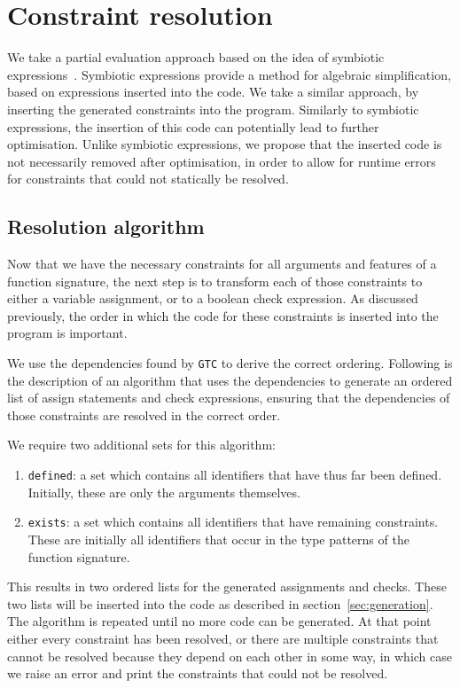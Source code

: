 \documentclass[sigconf,screen]{acmart}
\begin{document}
\section{Constraint resolution}
We take a partial evaluation approach based on the idea of symbiotic expressions~\cite{sac-symbiotic}.
Symbiotic expressions provide a method for algebraic simplification, based on expressions inserted into the code.
We take a similar approach, by inserting the generated constraints into the program.
Similarly to symbiotic expressions, the insertion of this code can potentially lead to further optimisation.
Unlike symbiotic expressions, we propose that the inserted code is not necessarily removed after optimisation, in order to allow for runtime errors for constraints that could not statically be resolved.

\subsection{Resolution algorithm}\label{sec:resoltion}
Now that we have the necessary constraints for all arguments and features of a function signature, the next step is to transform each of those constraints to either a variable assignment, or to a boolean check expression.
As discussed previously, the order in which the code for these constraints is inserted into the program is important.

We use the dependencies found by \texttt{GTC} to derive the correct ordering.
Following is the description of an algorithm that uses the dependencies to generate an ordered list of assign statements and check expressions, ensuring that the dependencies of those constraints are resolved in the correct order.

We require two additional sets for this algorithm:
\begin{enumerate}
  \item \texttt{defined}: a set which contains all identifiers that have thus far been defined.
  Initially, these are only the arguments themselves.
  \item \texttt{exists}: a set which contains all identifiers that have remaining constraints.
  These are initially all identifiers that occur in the type patterns of the function signature.
\end{enumerate}

This results in two ordered lists for the generated assignments and checks.
These two lists will be inserted into the code as described in section~\ref{sec:generation}.
The algorithm is repeated until no more code can be generated.
At that point either every constraint has been resolved, or there are multiple constraints that cannot be resolved because they depend on each other in some way, in which case we raise an error and print the constraints that could not be resolved.
\end{document}
